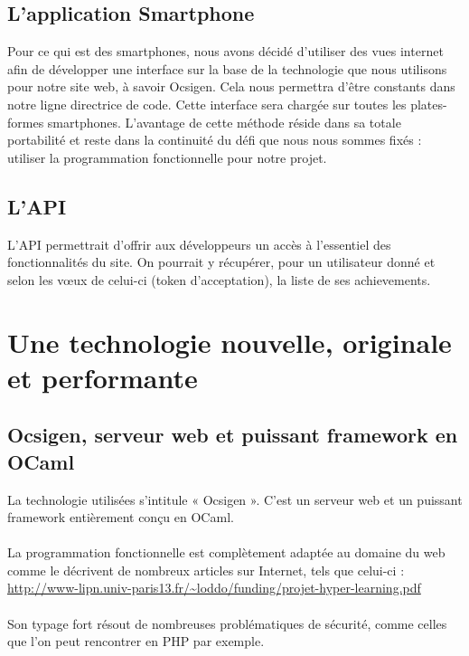 \documentclass{life-fr}
\begin{document}
\section{L'application Smartphone}

Pour ce qui est des smartphones, nous avons décidé d'utiliser des vues internet afin de développer une interface sur la base de la technologie que nous utilisons pour notre site web, à savoir Ocsigen. Cela nous permettra d'être constants dans notre ligne directrice de code. Cette interface sera chargée sur toutes les plates-formes smartphones. L'avantage de cette méthode réside dans sa totale portabilité et reste dans la continuité du défi que nous nous sommes fixés : utiliser la programmation fonctionnelle pour notre projet.

\section{L'API}

L'API permettrait d'offrir aux développeurs un accès à l'essentiel des fonctionnalités du site. On pourrait y récupérer, pour un utilisateur donné et selon les vœux de celui-ci (token d'acceptation), la liste de ses achievements.



\chapter{Une technologie nouvelle, originale et performante}

\section{Ocsigen, serveur web et puissant framework en OCaml}

La technologie utilisées s'intitule « Ocsigen ». C'est un serveur web et un puissant framework entièrement conçu en OCaml.\\
  \\
La programmation fonctionnelle est complètement adaptée au domaine du web comme le décrivent de nombreux articles sur Internet, tels que celui-ci :\\
\url{http://www-lipn.univ-paris13.fr/~loddo/funding/projet-hyper-learning.pdf}\\
\\
Son typage fort résout de nombreuses problématiques de sécurité, comme celles que l'on peut rencontrer en PHP par exemple.\\
\end{document}
